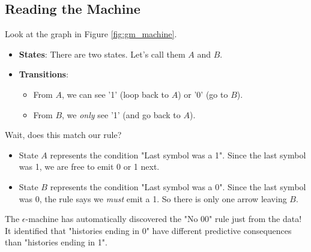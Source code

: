 \subsection{Reading the Machine}
Look at the graph in Figure \ref{fig:gm_machine}.
\begin{itemize}
    \item \textbf{States}: There are two states. Let's call them $A$ and $B$.
    \item \textbf{Transitions}:
    \begin{itemize}
        \item From $A$, we can see '1' (loop back to $A$) or '0' (go to $B$).
        \item From $B$, we \textit{only} see '1' (and go back to $A$).
    \end{itemize}
\end{itemize}

Wait, does this match our rule?
\begin{itemize}
    \item State $A$ represents the condition "Last symbol was a 1". Since the last symbol was 1, we are free to emit 0 or 1 next.
    \item State $B$ represents the condition "Last symbol was a 0". Since the last symbol was 0, the rule says we \textit{must} emit a 1. So there is only one arrow leaving $B$.
\end{itemize}

The $\epsilon$-machine has automatically discovered the "No 00" rule just from the data! It identified that "histories ending in 0" have different predictive consequences than "histories ending in 1".
